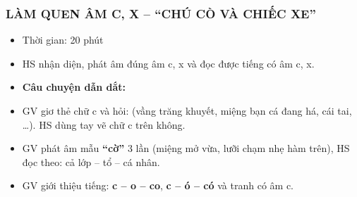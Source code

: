 \documentclass[../main.tex]{subfiles}
\begin{document}
\subsubsection{LÀM QUEN ÂM C, X -- “CHÚ CÒ VÀ CHIẾC XE”}
\begin{hd}
    \begin{itemize}
        \item Thời gian: 20 phút
        \item HS nhận diện, phát âm đúng âm c, x và đọc được tiếng có âm c, x.
    \end{itemize}
\end{hd}
\begin{itemize}
    \item \textbf{Câu chuyện dẫn dắt:} 
    \item GV giơ thẻ chữ c và hỏi:  (vầng trăng khuyết, miệng bạn cá đang há, cái tai, \dots). HS dùng tay vẽ chữ c trên không.
    \item GV phát âm mẫu \textbf{“cờ”} 3 lần (miệng mở vừa, lưỡi chạm nhẹ hàm trên), HS đọc theo: cả lớp -- tổ -- cá nhân.
    \item GV giới thiệu tiếng: \textbf{c -- o -- co}, \textbf{c -- ó -- có} và tranh có âm c.
\end{itemize}
\GAhinh
{\centering{}\par}
\vspace{4pt}
{\centering
    \hfill
    \begin{minipage}[b]{0.36\linewidth}\centering{}\\[6pt]\end{minipage}\par}
\end{document}
